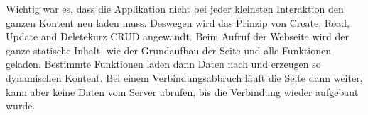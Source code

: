 Wichtig war es, dass die Applikation nicht bei jeder kleinsten Interaktion den ganzen Kontent neu laden muss.
Deswegen wird das Prinzip von \"Create, Read, Update and Delete\" kurz CRUD angewandt.
Beim Aufruf der Webseite wird der ganze statische Inhalt, wie der Grundaufbau der Seite und alle Funktionen geladen. Bestimmte Funktionen laden dann Daten nach und erzeugen so dynamischen Kontent.
Bei einem Verbindungsabbruch läuft die Seite dann weiter, kann aber keine Daten vom Server abrufen, bis die Verbindung wieder aufgebaut wurde.\\
\\

